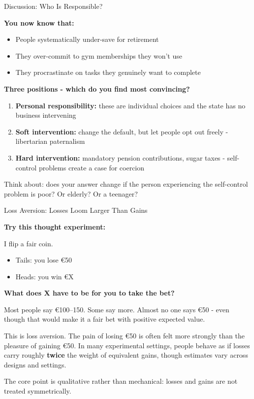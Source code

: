 \documentclass[10pt]{beamer}
\begin{document}
\begin{frame}{Discussion: Who Is Responsible?}

\textbf{You now know that:}
\begin{itemize}
\item People systematically under-save for retirement
\item They over-commit to gym memberships they won't use
\item They procrastinate on tasks they genuinely want to complete
\end{itemize}


\textbf{Three positions - which do you find most convincing?}


\begin{enumerate}
\item \textbf{Personal responsibility:} these are individual choices and the state has no business intervening
\item \textbf{Soft intervention:} change the default, but let people opt out freely - libertarian paternalism
\item \textbf{Hard intervention:} mandatory pension contributions, sugar taxes - self-control problems create a case for coercion
\end{enumerate}


\alert{Think about:} does your answer change if the person experiencing the self-control problem is poor?
Or elderly?
Or a teenager?
\end{frame}


\begin{frame}[allowframebreaks]{Loss Aversion: Losses Loom Larger Than Gains}

\textbf{Try this thought experiment:}


I flip a fair coin.
\begin{itemize}
\item Tails: you lose \euro 50
\item Heads: you win \euro X
\end{itemize}


\textbf{What does X have to be for you to take the bet?}


Most people say \euro 100--150.
Some say more.
Almost no one says \euro 50 - even though that would make it a fair bet with positive expected value.


\alert{This is loss aversion.}
The pain of losing \euro 50 is often felt more strongly than the pleasure of gaining \euro 50.
In many experimental settings, people behave as if losses carry roughly \textbf{twice} the weight of equivalent gains, though estimates vary across designs and settings.


\footnotesize The core point is qualitative rather than mechanical: losses and gains are not treated symmetrically.
\end{frame}
\end{document}
